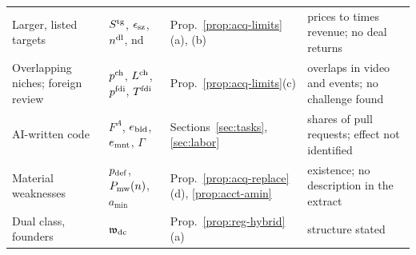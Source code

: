 \begin{table}[t]
\begin{tabular}{@{}p{3.6cm}p{3.7cm}p{3.4cm}p{4.7cm}@{}}
Larger, listed targets & $S^{\rm tg}$, $\epsilon_{\rm sz}$, $n^{\rm dl}$, $\mathrm{nd}$ & Prop.~\ref{prop:acq-limits}(a), (b) & prices \acqKEb{} to \acqKVim{} times revenue; no deal returns\\
Overlapping niches; foreign review & $p^{\rm ch}$, $L^{\rm ch}$, $p^{\rm fdi}$, $T^{\rm fdi}$ & Prop.~\ref{prop:acq-limits}(c) & overlaps in video and events; no challenge found\\
AI-written code & $F^A$, $e_{\rm bld}$, $e_{\rm mnt}$, $\Gamma$ & Sections~\ref{sec:tasks}, \ref{sec:labor} & shares of pull requests; effect not identified\\
Material weaknesses & $p_{\rm def}$, $P_{\rm mw}(n)$, $a_{\min}$ & Prop.~\ref{prop:acq-replace}(d), \ref{prop:acct-amin} & existence; no description in the extract\\
Dual class, founders & $\mathfrak w_{\rm dc}$ & Prop.~\ref{prop:reg-hybrid}(a) & structure stated\\
\bottomrule
\end{tabular}
\end{table}
